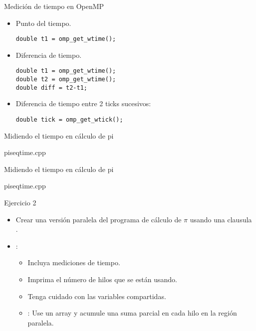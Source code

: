 \begin{frame}[t,fragile]{Medición de tiempo en OpenMP}
\begin{itemize}

\item Punto del tiempo.
\begin{lstlisting}
double t1 = omp_get_wtime();
\end{lstlisting}

\item Diferencia de tiempo.
\begin{lstlisting}
double t1 = omp_get_wtime();
double t2 = omp_get_wtime();
double diff = t2-t1;
\end{lstlisting}

\item Diferencia de tiempo entre 2 ticks sucesivos:
\begin{lstlisting}
double tick = omp_get_wtick();
\end{lstlisting}

\end{itemize}
\end{frame}

\begin{frame}[t]{Midiendo el tiempo en cálculo de pi}
\begin{block}{piseqtime.cpp}

\end{block}
\end{frame}

\begin{frame}[t]{Midiendo el tiempo en cálculo de pi}
\begin{block}{piseqtime.cpp}

\end{block}
\end{frame}

\begin{frame}[t]{Ejercicio 2}
\begin{itemize}
\item Crear una versión paralela del programa de cálculo de $\pi$ usando
      una clausula .

\item {}:
  \begin{itemize}
    \item Incluya mediciones de tiempo.
    \item Imprima el número de hilos que se están usando.
    \item Tenga cuidado con las variables compartidas.
    \item {}: Use un array y acumule una suma parcial en cada hilo en la región paralela.
  \end{itemize}
\end{itemize}
\end{frame}
